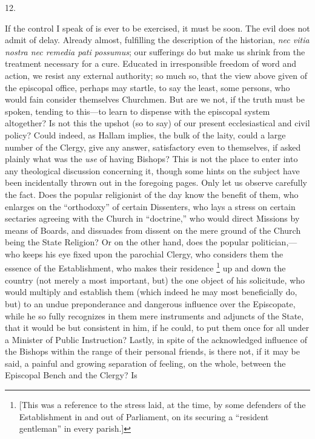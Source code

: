 12.

If the control I speak of is ever to be
exercised, it must be soon. The evil does not admit of delay. Already
almost, fulfilling the description of the historian, \emph{nec vitia
nostra nec remedia pati possumus}; our sufferings do but make us
shrink from the treatment necessary for a cure. Educated in
irresponsible freedom of word and action, we resist any external
authority; so much so, that the view above given of the episcopal
office, perhaps may startle, to say the least, some persons, who would
fain consider themselves Churchmen. But are we not, if the truth must
be spoken, tending to this—to learn to dispense with the episcopal
system altogether? Is not this the upshot (so to say) of our present
ecclesiastical and civil policy? Could indeed, as Hallam implies, the
bulk of the laity, could a large number of the Clergy, give any
answer, satisfactory even to themselves, if asked plainly what
was the \emph{use} of having Bishops? This is not the place to enter
into any theological discussion concerning it, though some hints on
the subject have been incidentally thrown out in the foregoing pages.
Only let us observe carefully the fact. Does the popular religionist
of the day know the benefit of them, who enlarges on the ``orthodoxy''
of certain Dissenters, who lays a stress on certain sectaries agreeing
with the Church in ``doctrine,'' who would direct Missions by means of
Boards, and dissuades from dissent on the mere ground of the Church
being the State Religion? Or on the other hand, does the popular
politician,—who keeps his eye fixed upon the parochial Clergy, who
considers them the essence of the Establishment, who makes their
residence \footnote{[This was a reference to the stress laid, at the time, by some
defenders of the Establishment in and out of Parliament, on its
securing a ``resident gentleman'' in every parish.]} up and down the
country (not merely a most important, but) the one object of his
solicitude, who would multiply and establish them (which indeed he may
most beneficially do, but) to an undue preponderance and dangerous
influence over the Episcopate, while he so fully recognizes in them
mere instruments and adjuncts of the State, that it would be but
consistent in him, if he could, to put them once for all under a
Minister of Public Instruction? Lastly, in spite of the acknowledged
influence of the Bishops within the range of their personal friends,
is there not, if it may be said, a painful and growing separation of
feeling, on the whole, between the Episcopal Bench and the Clergy? Is
